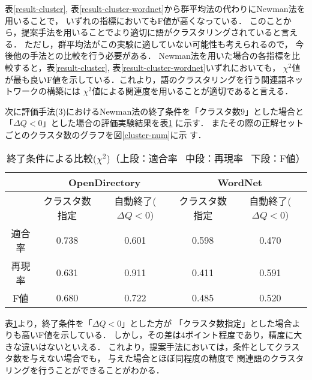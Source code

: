 \documentclass[japanese]{jnlp_1.3a}
\begin{document}
表\ref{result-cluster}, 表\ref{result-cluster-wordnet}から群平均法の代わりにNewman法を用いることで，
いずれの指標においてもF値が高くなっている．
このことから，提案手法を用いることでより適切に語がクラスタリングされていると言える．
ただし，群平均法がこの実験に適していない可能性も考えられるので，
今後他の手法との比較を行う必要がある．
Newman法を用いた場合の各指標を比較すると，表\ref{result-cluster}, 表\ref{result-cluster-wordnet}いずれにおいても，
$\chi^2$値が最も良いF値を示している．これより，語のクラスタリングを行う関連語ネットワークの構築には
$\chi^2$値による関連度を用いることが適切であると言える．

次に評価手法(3)におけるNewman法の終了条件を「クラスタ数9」とした場合と
「$\Delta Q<0 $」とした場合の評価実験結果を表\ref{final-condition}
に示す．
またその際の正解セットごとのクラスタ数のグラフを図\ref{cluster-num}に示
す．

\begin{table}[b]
	\begin{center}
	 \caption{終了条件による比較($\chi^2$)（上段：適合率 \ 中段：再現率
	\  下段：F値）}
	\label{final-condition}
	 \begin{tabular}{c|cc|cc}
	  & \multicolumn{2}{c|}{OpenDirectory} &
	  \multicolumn{2}{c}{WordNet} \\ \hline
	  & クラスタ数指定 & 自動終了($\Delta Q<0 $) & クラスタ数指定 &
	  自動終了($\Delta Q<0 $) \\ \hline 
	 
	  適合率 & 0.738 & 0.601 & 0.598 & 0.470 \\ 
	  再現率 & 0.631 & 0.911 & 0.411 & 0.591 \\ 
	  F値    & 0.680 & 0.722 & 0.485 & 0.520 \\ \hline
	 \end{tabular}
	\end{center}
\end{table}

表\ref{final-condition}より，終了条件を「$\Delta Q<0$」とした方が
「クラスタ数指定」とした場合よりも高いF値を示している．
しかし，その差は4ポイント程度であり，精度に大きな違いはないといえる．
これより，提案手法においては，条件としてクラスタ数を与えない場合でも，
与えた場合とほぼ同程度の精度で
関連語のクラスタリングを行うことができることがわかる．
\end{document}
